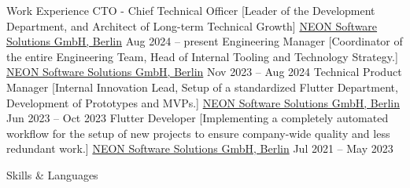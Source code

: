 \documentclass[
]{../llresume}
\begin{document}
\begin{mainpane}
    \begin{mainsection}{Work Experience}
        \entryJob
            {CTO - Chief Technical Officer}
            [Leader of the Development Department, and Architect of Long-term Technical Growth]
            {\href{https://www.neon.dev/}{NEON Software Solutions GmbH, Berlin}}
            {Aug 2024 -- present}
        \entryJob
            {Engineering Manager}
            [Coordinator of the entire Engineering Team, Head of Internal Tooling and Technology Strategy.]
            {\href{https://www.neon.dev/}{NEON Software Solutions GmbH, Berlin}}
            {Nov 2023 -- Aug 2024}
        \entryJob
            {Technical Product Manager}
            [Internal Innovation Lead, Setup of a standardized Flutter Department, Development of Prototypes and MVPs.]
            {\href{https://www.neon.dev/}{NEON Software Solutions GmbH, Berlin}}
            {Jun 2023 -- Oct 2023}
        \entryJob
            {Flutter Developer}
            [Implementing a completely automated workflow for the setup of new projects to ensure company-wide quality and less redundant work.]
            {\href{https://www.neon.dev/}{NEON Software Solutions GmbH, Berlin}}
            {Jul 2021 -- May 2023}
    \end{mainsection}

    \begin{mainsection}{Skills \& Languages}
    \end{mainsection}
\end{mainpane}
\end{document}
